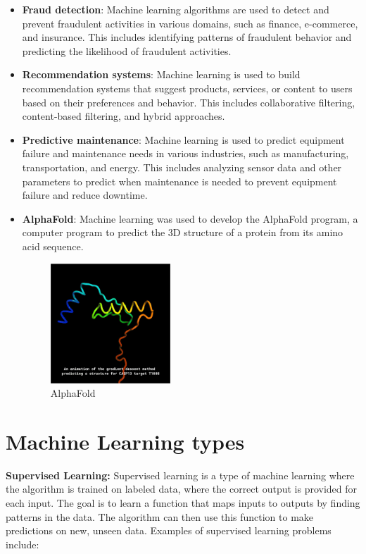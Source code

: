 \documentclass{article}
\begin{document}
\begin{itemize}
    \item \textbf{Fraud detection}: Machine learning algorithms are used to detect and prevent fraudulent activities in various domains, such as finance, e-commerce, and insurance. This includes identifying patterns of fraudulent behavior and predicting the likelihood of fraudulent activities.
    
    \item \textbf{Recommendation systems}: Machine learning is used to build recommendation systems that suggest products, services, or content to users based on their preferences and behavior. This includes collaborative filtering, content-based filtering, and hybrid approaches.
    
    \item \textbf{Predictive maintenance}: Machine learning is used to predict equipment failure and maintenance needs in various industries, such as manufacturing, transportation, and energy. This includes analyzing sensor data and other parameters to predict when maintenance is needed to prevent equipment failure and reduce downtime.
    
    \item \textbf{AlphaFold}: Machine learning was used to develop the AlphaFold program, a computer program to predict the 3D structure of a protein from its amino acid sequence.
    \begin{figure}[!h]
        \centering
        \includegraphics[width=4.5cm]{./images/p30_img183.png}
        \caption{AlphaFold}
    \end{figure}
\end{itemize}

\section{Machine Learning types}
\textbf{Supervised Learning:}
Supervised learning is a type of machine learning where the algorithm is trained on labeled data, where the correct output is provided for each input. The goal is to learn a function that maps inputs to outputs by finding patterns in the data. The algorithm can then use this function to make predictions on new, unseen data. Examples of supervised learning problems include:
\end{document}
